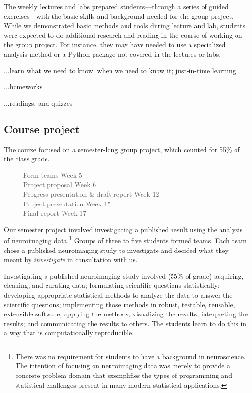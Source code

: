 The weekly lectures and labs prepared students---through a
series of guided exercises---with the basic skills and
background needed for the group project.
While we demonstrated basic methods and tools during lecture and lab,
students were expected to do additional research and reading in the course
of working on the group project.
For instance, they may have needed to use a specialized analysis
method or a Python package not covered in the lectures or labs.

...learn what we need to know, when we need to know it; just-in-time learning 

...homeworks

...readings, and quizzes

\subsection{Course project}\label{project}

The course focused on a semester-long group project, which counted for
55\% of the class grade.
\begin{quote}
\begin{flushleft}
Form teams \dotfill Week 5\\
Project proposal \dotfill Week 6\\
Progress presentation \& draft report \dotfill Week 12\\
Project presentation \dotfill Week 15\\
Final report \dotfill Week 17\\
\end{flushleft}
\end{quote}

Our semester project involved investigating a published result using the
analysis of neuroimaging data.\footnote{There was no requirement
for students to have a background in neuroscience.  The intention of focusing
on neuroimaging data was  merely to provide a concrete problem domain that
exemplifies the types of programming and statistical challenges present in many
modern statistical applications.}
Groups of three to five students formed teams.
Each team chose a published neuroimaging study to investigate and
decided what they meant by \emph{investigate} in consultation with us.

Investigating a published neuroimaging study involved
(55\% of grade)
acquiring, cleaning, and curating data;
formulating scientific questions statistically;
developing appropriate statistical methods
to analyze the data to answer the scientific questions;
implementing those methods in robust, testable, reusable, extensible software;
applying the methods;
visualizing the results;
interpreting the results;
and communicating the results to others.
The students learn to do this in a way that is
computationally reproducible.


